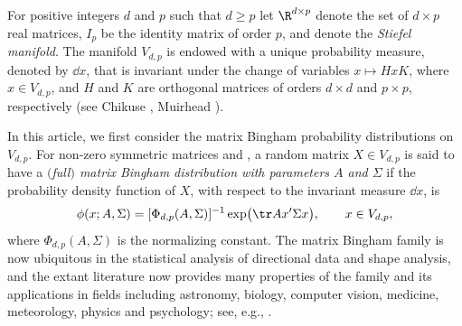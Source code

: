 For positive integers $d$ and $p$ such that $d \ge p$ let $\R^{d \times p}$ denote the set of $d \times p$ real matrices, $I_p$ be the identity matrix of order $p$, and  denote the \textit{Stiefel manifold}. The manifold $V_{d,p}$ is endowed with a unique probability measure, denoted by $\dd x$, that is invariant under the change of variables $x \mapsto HxK$, where $x \in V_{d,p}$, and $H$ and $K$ are orthogonal matrices of orders $d \times d$ and $p \times p$, respectively (see Chikuse \cite[p.~16]{Chikuse}, Muirhead \cite[p.~70]{Muirhead}).

In this article, we first consider the matrix Bingham probability distributions on $V_{d,p}$. For non-zero symmetric matrices  and , a random matrix $X \in V_{d,p}$ is said to have a {\it $($full$)$ matrix Bingham distribution with parameters $A$ and $\Sigma$} if the probability density function of $X$, with respect to the invariant measure $\dd x$, is
\begin{equation}
\label{eq_mBingham_pdf}
\phi(x;A,\Sigma) = [\Phi_{d,p}(A,\Sigma)]^{-1} \exp\bigl(\tr Ax'\Sigma x\bigr), \qquad x \in V_{d,p},
\end{equation}
where $\Phi_{d,p}(A,\Sigma)$ is the normalizing constant. The matrix Bingham family is now ubiquitous in the statistical analysis of directional data and shape analysis, and the extant literature now provides many properties of the family and its applications in fields including astronomy, biology, computer vision, medicine, meteorology, physics and psychology; see, e.g., \cite{BinghamCR,Chikuse,Dryden,JuppMardia2,KhatriMardia,KumeWood,KumePrestonWood,MardiaJupp,Prentice}.
